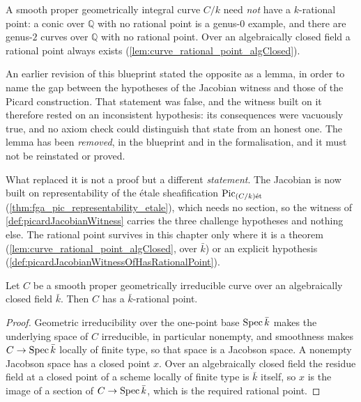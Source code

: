 \begin{remark}
  \label{lem:curve_hypothesis_gap}
  A smooth proper geometrically integral curve \(C/k\) need \emph{not} have a
  \(k\)-rational point: a conic over \(\mathbb{Q}\) with no rational point is a
  genus-\(0\) example, and there are genus-\(2\) curves over \(\mathbb{Q}\) with
  no rational point. Over an algebraically closed field a rational point always
  exists (\cref{lem:curve_rational_point_algClosed}).

  An earlier revision of this blueprint stated the opposite as a lemma, in order
  to name the gap between the hypotheses of the Jacobian witness and those of the
  Picard construction. That statement was false, and the witness built on it
  therefore rested on an inconsistent hypothesis: its consequences were vacuously
  true, and no axiom check could distinguish that state from an honest one. The
  lemma has been \emph{removed}, in the blueprint and in the formalisation, and
  it must not be reinstated or proved.

  What replaced it is not a proof but a different \emph{statement}. The Jacobian
  is now built on representability of the \'etale sheafification
  \(\operatorname{Pic}_{(C/k)\mathrm{\acute{e}t}}\) (\cref{thm:fga_pic_representability_etale}), which needs no
  section, so the witness of \cref{def:picardJacobianWitness} carries the three
  challenge hypotheses and nothing else. The rational point survives in this
  chapter only where it is a theorem
  (\cref{lem:curve_rational_point_algClosed}, over \(\bar k\)) or an explicit
  hypothesis (\cref{def:picardJacobianWitnessOfHasRationalPoint}).
\end{remark}

\begin{lemma}
  \label{lem:curve_rational_point_algClosed}
  \leanok
  Let \(C\) be a smooth proper geometrically irreducible curve over an algebraically
  closed field \(\bar k\). Then \(C\) has a \(\bar k\)-rational point.
\end{lemma}

\begin{proof}
  \leanok
  Geometric irreducibility over the one-point base \(\operatorname{Spec} \bar k\) makes the
  underlying space of \(C\) irreducible, in particular nonempty, and smoothness makes
  \(C \to \operatorname{Spec} \bar k\) locally of finite type, so that space is a Jacobson space.
  A nonempty Jacobson space has a closed point \(x\). Over an algebraically closed
  field the residue field at a closed point of a scheme locally of finite type is
  \(\bar k\) itself, so \(x\) is the image of a section of \(C \to \operatorname{Spec} \bar k\),
  which is the required rational point.
\end{proof}

